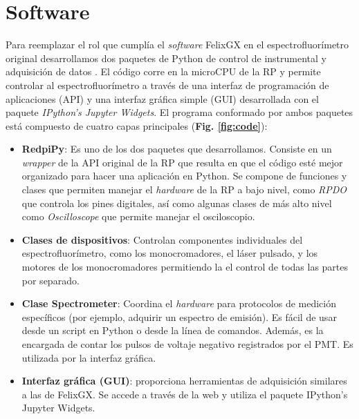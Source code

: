 

\section{Software} \label{sec:software}

Para reemplazar el rol que cumplía el \textit{software} FelixGX en el espectrofluorímetro original desarrollamos dos paquetes de Python de control de instrumental y adquisición de datos \cite{napoli_tdinapoli_2024,grecco_hgrecco_2024}.
El código corre en la microCPU de la RP y permite controlar al espectrofluorímetro a través de una interfaz de programación de aplicaciones (API) y una interfaz gráfica simple (GUI) desarrollada con el paquete \textit{IPython's Jupyter Widgets}.
El programa conformado por ambos paquetes está compuesto de cuatro capas principales (\textbf{Fig. \ref{fig:code}}):

\begin{itemize}
     \item \textbf{RedpiPy}: Es uno de los dos paquetes que desarrollamos. Consiste en un \textit{wrapper} de la API original de la RP que resulta en que el código esté mejor organizado para hacer una aplicación en Python. Se compone de funciones y clases que permiten manejar el \textit{hardware} de la RP a bajo nivel, como \textit{RPDO} que controla los pines digitales, así como algunas clases de más alto nivel como \textit{Oscilloscope} que permite manejar el osciloscopio.
     \item \textbf{Clases de dispositivos}: Controlan componentes individuales del espectrofluorímetro, como los monocromadores, el láser pulsado, y los motores de los monocromadores permitiendo la el control de todas las partes por separado. 
     \item \textbf{Clase Spectrometer}: Coordina el \textit{hardware} para protocolos de medición específicos (por ejemplo, adquirir un espectro de emisión). Es fácil de usar desde un script en Python o desde la línea de comandos. Además, es la encargada de contar los pulsos de voltaje negativo registrados por el PMT. Es utilizada por la interfaz gráfica.
     \item \textbf{Interfaz gráfica (GUI)}: proporciona herramientas de adquisición similares a las de FelixGX. Se accede a través de la web y utiliza el paquete IPython's Jupyter Widgets.
\end{itemize}


